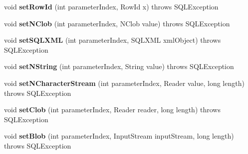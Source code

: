 \begin{DoxyCompactItemize}
void {\bfseries set\+Row\+Id} (int parameter\+Index, Row\+Id x)  throws S\+Q\+L\+Exception 
\item 
\mbox{\label{classcom_1_1mysql_1_1jdbc_1_1jdbc2_1_1optional_1_1_j_d_b_c4_callable_statement_wrapper_a8b55bac25c4278a814943ddf5e122112}} 
void {\bfseries set\+N\+Clob} (int parameter\+Index, N\+Clob value)  throws S\+Q\+L\+Exception 
\item 
\mbox{\label{classcom_1_1mysql_1_1jdbc_1_1jdbc2_1_1optional_1_1_j_d_b_c4_callable_statement_wrapper_a2aa69ecd36ca8e204a7c805eca8c3eb6}} 
void {\bfseries set\+S\+Q\+L\+X\+ML} (int parameter\+Index, S\+Q\+L\+X\+ML xml\+Object)  throws S\+Q\+L\+Exception 
\item 
\mbox{\label{classcom_1_1mysql_1_1jdbc_1_1jdbc2_1_1optional_1_1_j_d_b_c4_callable_statement_wrapper_a586ca511501093c239b5a6f1c0873576}} 
void {\bfseries set\+N\+String} (int parameter\+Index, String value)  throws S\+Q\+L\+Exception 
\item 
\mbox{\label{classcom_1_1mysql_1_1jdbc_1_1jdbc2_1_1optional_1_1_j_d_b_c4_callable_statement_wrapper_a07d1ca725cb19c4498c10f8016f5c3ea}} 
void {\bfseries set\+N\+Character\+Stream} (int parameter\+Index, Reader value, long length)  throws S\+Q\+L\+Exception 
\item 
\mbox{\label{classcom_1_1mysql_1_1jdbc_1_1jdbc2_1_1optional_1_1_j_d_b_c4_callable_statement_wrapper_ab02bc4349d446fa82f5f0890a952c191}} 
void {\bfseries set\+Clob} (int parameter\+Index, Reader reader, long length)  throws S\+Q\+L\+Exception 
\item 
\mbox{\label{classcom_1_1mysql_1_1jdbc_1_1jdbc2_1_1optional_1_1_j_d_b_c4_callable_statement_wrapper_a41f9e77b5c1d83959b08f693af79f56f}} 
void {\bfseries set\+Blob} (int parameter\+Index, Input\+Stream input\+Stream, long length)  throws S\+Q\+L\+Exception 

\end{DoxyCompactItemize}

